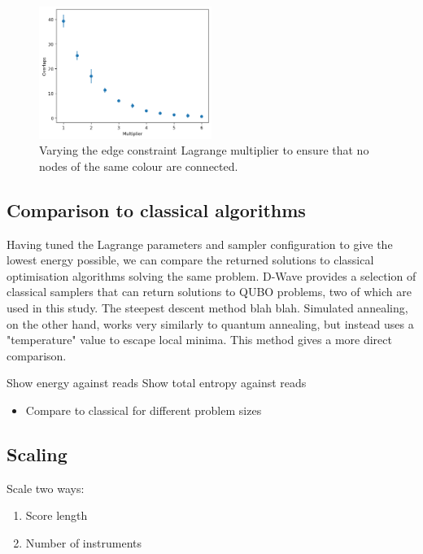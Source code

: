 \documentclass[12pt]{article}
\theoremstyle{definition}
\begin{document}
\begin{figure}
    \includegraphics[width=0.5\textwidth]{edge-constraint.png}
    \caption{Varying the edge constraint Lagrange multiplier to ensure that no nodes of the same colour are connected.}
\end{figure}

\subsection{Comparison to classical algorithms}

Having tuned the Lagrange parameters and sampler configuration to give the lowest energy possible, we can compare the returned solutions to classical optimisation algorithms solving the same problem. D-Wave provides a selection of classical samplers that can return solutions to QUBO problems, two of which are used in this study. The steepest descent method blah blah. Simulated annealing, on the other hand, works very similarly to quantum annealing, but instead uses a "temperature" value to escape local minima. This method gives a more direct comparison.

Show energy against reads
Show total entropy against reads


\begin{itemize}
    \item Compare to classical for different problem sizes
\end{itemize}

\subsection{Scaling}

Scale two ways:

\begin{enumerate}
    \item Score length
    \item Number of instruments
\end{enumerate}
\end{document}
